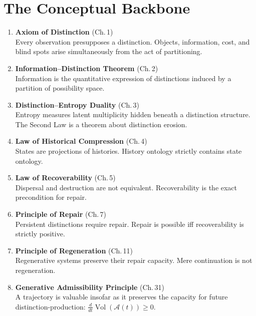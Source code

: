 \documentclass[12pt,twoside,openright]{book}
\newcommand{\adm}{\mathcal{A}}
\newcommand{\Vol}{\operatorname{Vol}}
\begin{document}
\chapter*{The Conceptual Backbone}
\thispagestyle{empty}
\begin{tcolorbox}[colback=DistGoldBg,colframe=DistGold,
  fonttitle=\sffamily\bfseries\color{white},
  title={\faLayerGroup\enspace Eight Structural Results},breakable]
\begin{enumerate}[leftmargin=*,itemsep=0.6em,label=\textbf{\arabic*.}]
  \item \textbf{Axiom of Distinction} (Ch.\,1)\\
  {\small Every observation presupposes a distinction.
  Objects, information, cost, and blind spots arise
  simultaneously from the act of partitioning.}
  \item \textbf{Information--Distinction Theorem} (Ch.\,2)\\
  {\small Information is the quantitative expression of
  distinctions induced by a partition of possibility space.}
  \item \textbf{Distinction--Entropy Duality} (Ch.\,3)\\
  {\small Entropy measures latent multiplicity hidden beneath
  a distinction structure. The Second Law is a theorem about
  distinction erosion.}
  \item \textbf{Law of Historical Compression} (Ch.\,4)\\
  {\small States are projections of histories. History
  ontology strictly contains state ontology.}
  \item \textbf{Law of Recoverability} (Ch.\,5)\\
  {\small Dispersal and destruction are not equivalent.
  Recoverability is the exact precondition for repair.}
  \item \textbf{Principle of Repair} (Ch.\,7)\\
  {\small Persistent distinctions require repair. Repair
  is possible iff recoverability is strictly positive.}
  \item \textbf{Principle of Regeneration} (Ch.\,11)\\
  {\small Regenerative systems preserve their repair capacity.
  Mere continuation is not regeneration.}
  \item \textbf{Generative Admissibility Principle} (Ch.\,31)\\
  {\small A trajectory is valuable insofar as it preserves
  the capacity for future distinction-production:
  $\frac{d}{dt}\Vol(\adm(t))\ge0$.}
\end{enumerate}
\end{tcolorbox}\clearpage
\end{document}
